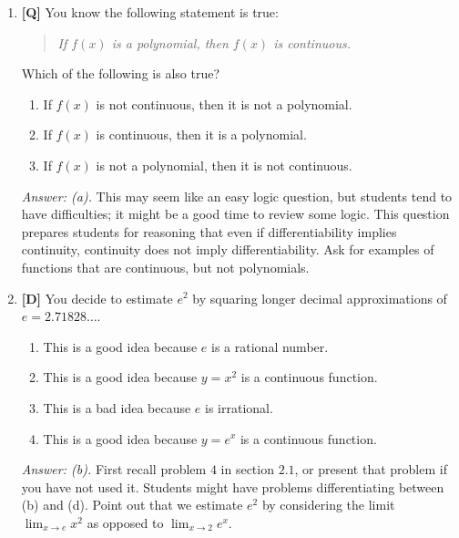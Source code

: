 \documentclass[12pt]{article}
\begin{document}
\begin{enumerate}
{\it Answer: (a)}  Again, students should be encouraged to draw
the graph of $g(x)$.  It is interesting to compare this to the 
previous question.  It should be pointed out the difference between
the independent variables in the two problems. 

\bigskip

\item {\bf [Q]} You know the following statement is true: 
\begin{quote}
\emph{If $f(x)$ is a polynomial, then $f(x)$ is continuous.}
\end{quote}
Which of the following is also true?
\begin{enumerate}
\item If $f(x)$ is not continuous, then it is not a polynomial.
\item If $f(x)$ is continuous, then it is a polynomial.
\item If $f(x)$ is not a polynomial, then it is not continuous.
\end{enumerate}

{\it Answer: (a).} This may seem like an easy logic question, but students tend to have difficulties; it might be a good time to review some logic. This question prepares students for reasoning that even if differentiability implies continuity, continuity 
does not imply differentiability. Ask for examples of functions that are continuous, but not polynomials.

\bigskip

\item {\bf [D]} You decide to estimate $e^2$ by squaring longer decimal
approximations of $e=2.71828\ldots$. 
\begin{enumerate}
\item This is a good idea because $e$ is a rational number.
\item This is a good idea because $y=x^2$ is a continuous function.
\item This is a bad idea because $e$ is irrational.
\item This is a good idea because $y=e^x$ is a continuous function.
\end{enumerate}

{\it Answer: (b).} First recall problem $4$ in section $2.1$, or present that problem if you have not used it. Students might have problems differentiating between (b) and (d). Point out that we estimate $e^2$ by considering the limit
$\displaystyle{\lim_{x\rightarrow e}x^2}$ as opposed to $\displaystyle{\lim_{x\rightarrow 2}e^x}$.


\end{enumerate}
\end{document}
